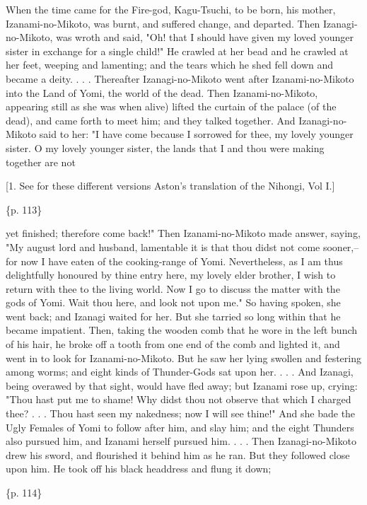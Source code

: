 When the time came for the Fire-god, Kagu-Tsuchi, to be born, his mother, Izanami-no-Mikoto, was burnt, and suffered change, and departed. Then Izanagi-no-Mikoto, was wroth and said, "Oh! that I should have given my loved younger sister in exchange for a single child!" He crawled at her bead and he crawled at her feet, weeping and lamenting; and the tears which he shed fell down and became a deity. . . . Thereafter Izanagi-no-Mikoto went after Izanami-no-Mikoto into the Land of Yomi, the world of the dead. Then Izanami-no-Mikoto, appearing still as she was when alive) lifted the curtain of the palace (of the dead), and came forth to meet him; and they talked together. And Izanagi-no-Mikoto said to her: "I have come because I sorrowed for thee, my lovely younger sister. O my lovely younger sister, the lands that I and thou were making together are not

[1. See for these different versions Aston's translation of the Nihongi, Vol I.]

\{p. 113\}

yet finished; therefore come back!" Then Izanami-no-Mikoto made answer, saying, "My august lord and husband, lamentable it is that thou didst not come sooner,--for now I have eaten of the cooking-range of Yomi. Nevertheless, as I am thus delightfully honoured by thine entry here, my lovely elder brother, I wish to return with thee to the living world. Now I go to discuss the matter with the gods of Yomi. Wait thou here, and look not upon me." So having spoken, she went back; and Izanagi waited for her. But she tarried so long within that he became impatient. Then, taking the wooden comb that he wore in the left bunch of his hair, he broke off a tooth from one end of the comb and lighted it, and went in to look for Izanami-no-Mikoto. But he saw her lying swollen and festering among worms; and eight kinds of Thunder-Gods sat upon her. . . . And Izanagi, being overawed by that sight, would have fled away; but Izanami rose up, crying: "Thou hast put me to shame! Why didst thou not observe that which I charged thee? . . . Thou hast seen my nakedness; now I will see thine!" And she bade the Ugly Females of Yomi to follow after him, and slay him; and the eight Thunders also pursued him, and Izanami herself pursued him. . . . Then Izanagi-no-Mikoto drew his sword, and flourished it behind him as he ran. But they followed close upon him. He took off his black headdress and flung it down;

\{p. 114\}

